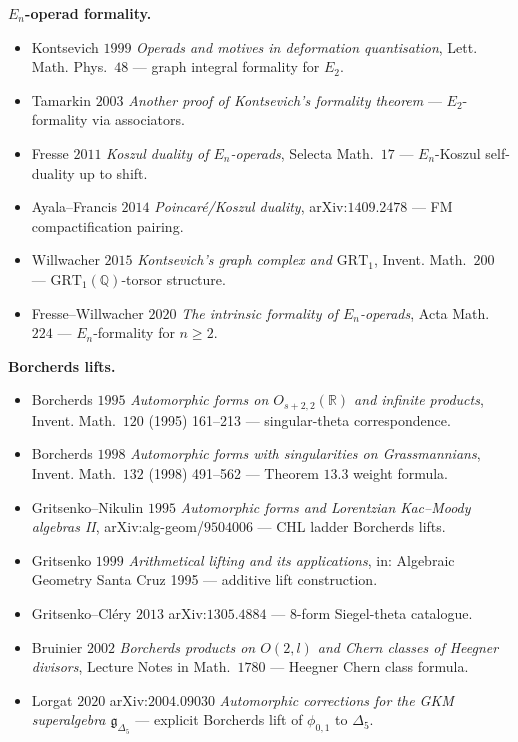 \documentclass[11pt]{amsart}
\providecommand{\R}{\mathbb{R}}
\providecommand{\Q}{\mathbb{Q}}
\providecommand{\fg}{\mathfrak{g}}
\providecommand{\GRT}{\mathrm{GRT}}
\begin{document}
\noindent\textbf{$E_n$-operad formality.}
\begin{itemize}
\item Kontsevich $1999$ \emph{Operads and motives in deformation
quantisation}, Lett. Math. Phys.~$48$ --- graph integral
formality for $E_2$.
\item Tamarkin $2003$ \emph{Another proof of Kontsevich's
formality theorem} --- $E_2$-formality via associators.
\item Fresse $2011$ \emph{Koszul duality of $E_n$-operads},
Selecta Math.~$17$ --- $E_n$-Koszul self-duality up to shift.
\item Ayala--Francis $2014$ \emph{Poincar\'e/Koszul duality},
arXiv:$1409.2478$ --- FM compactification pairing.
\item Willwacher $2015$ \emph{Kontsevich's graph complex and
$\GRT_1$}, Invent. Math.~$200$ --- $\GRT_1(\Q)$-torsor structure.
\item Fresse--Willwacher $2020$ \emph{The intrinsic formality of
$E_n$-operads}, Acta Math.~$224$ --- $E_n$-formality for
$n \geq 2$.
\end{itemize}

\noindent\textbf{Borcherds lifts.}
\begin{itemize}
\item Borcherds $1995$ \emph{Automorphic forms on $O_{s + 2, 2}(\R)$
and infinite products}, Invent. Math.~$120$ (1995) 161--213 ---
singular-theta correspondence.
\item Borcherds $1998$ \emph{Automorphic forms with singularities on
Grassmannians}, Invent. Math.~$132$ (1998) 491--562 --- Theorem $13.3$
weight formula.
\item Gritsenko--Nikulin $1995$ \emph{Automorphic forms and Lorentzian
Kac--Moody algebras II}, arXiv:alg-geom/$9504006$ --- CHL ladder
Borcherds lifts.
\item Gritsenko $1999$ \emph{Arithmetical lifting and its
applications}, in: Algebraic Geometry Santa Cruz 1995 --- additive
lift construction.
\item Gritsenko--Cl\'ery $2013$ arXiv:$1305.4884$ --- $8$-form
Siegel-theta catalogue.
\item Bruinier $2002$ \emph{Borcherds products on $O(2, l)$ and
Chern classes of Heegner divisors}, Lecture Notes in Math.~$1780$
--- Heegner Chern class formula.
\item Lorgat $2020$ arXiv:$2004.09030$ \emph{Automorphic corrections
for the GKM superalgebra $\fg_{\Delta_5}$} --- explicit Borcherds
lift of $\phi_{0, 1}$ to $\Delta_5$.
\end{itemize}
\end{document}
